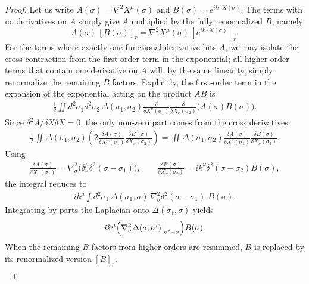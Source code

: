 \begin{tcolorbox}[breakable]
\begin{proof}
			Let us write $A(\sigma)=\nabla^2 X^\mu(\sigma)$ and $B(\sigma)=e^{ik\cdot X(\sigma)}$. The terms with no derivatives on $A$ simply give $A$ multiplied by the fully renormalized $B$, namely
			\begin{equation}
				A(\sigma)\,[B(\sigma)]_r = \nabla^2 X^\mu(\sigma)\,[e^{ik\cdot X(\sigma)}]_r.
			\end{equation}
			For the terms where exactly one functional derivative hits $A$, we may isolate the cross‑contraction from the first‑order term in the exponential; all higher‑order terms that contain one derivative on $A$ will, by the same linearity, simply renormalize the remaining $B$ factors. Explicitly, the first‑order term in the expansion of the exponential acting on the product $A B$ is
			\begin{align}
				\frac12 \iint d^2\sigma_1 d^2\sigma_2 \,\Delta(\sigma_1,\sigma_2) \frac{\delta}{\delta X^\nu(\sigma_1)} \frac{\delta}{\delta X_\nu(\sigma_2)} \bigl( A(\sigma) B(\sigma) \bigr).
			\end{align}
			Since $\delta^2 A/\delta X\delta X =0$, the only non‑zero part comes from the cross derivatives:
			\begin{align}
				\frac12 \iint \Delta(\sigma_1,\sigma_2) \left( 2 \frac{\delta A(\sigma)}{\delta X^\nu(\sigma_1)} \frac{\delta B(\sigma)}{\delta X_\nu(\sigma_2)} \right)
				= \iint \Delta(\sigma_1,\sigma_2) \frac{\delta A(\sigma)}{\delta X^\nu(\sigma_1)} \frac{\delta B(\sigma)}{\delta X_\nu(\sigma_2)}.
			\end{align}
			Using
			\begin{align}
				\frac{\delta A(\sigma)}{\delta X^\nu(\sigma_1)} = \nabla^2_\sigma\bigl( \delta^\mu_\nu \delta^2(\sigma-\sigma_1) \bigr),\qquad
				\frac{\delta B(\sigma)}{\delta X_\nu(\sigma_2)} = i k^\nu \delta^2(\sigma-\sigma_2) B(\sigma),
			\end{align}
			the integral reduces to
			\begin{align}
				i k^\mu \int d^2\sigma_1 \,\Delta(\sigma_1,\sigma) \,\nabla^2_\sigma \delta^2(\sigma-\sigma_1) \; B(\sigma).
			\end{align}
			Integrating by parts the Laplacian onto $\Delta(\sigma_1,\sigma)$ yields
			\begin{align}
				i k^\mu \Bigl( \nabla^2_\sigma \Delta(\sigma,\sigma') \big|_{\sigma'=\sigma} \Bigr) B(\sigma).
			\end{align}
			When the remaining $B$ factors from higher orders are resummed, $B$ is replaced by its renormalized version $[B]_r$. 
			\begin{align}

\end{align}
\end{proof}
\end{tcolorbox}
